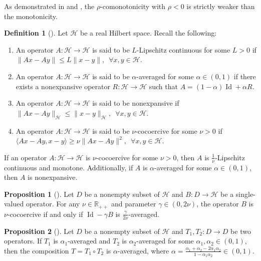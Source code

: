 \documentclass{article}
\theoremstyle{definition}
\newtheorem{proposition}{Proposition}[section]
\theoremstyle{definition}
\newtheorem{definition}{Definition}[section]
\theoremstyle{definition}
\begin{document}
As demonstrated in \cite[Example 1]{lee2021} and \cite[Example 3]{pethick2023}, the $\rho$-comonotonicity with $\rho < 0$ is strictly weaker than the monotonicity.

\begin{definition} [\cite{bauschke2017convex}]
Let $\mathcal{H}$ be a real Hilbert space.  Recall the following: 
\begin{enumerate}[label=(\roman*)]
    \item[(1)] An operator $A: \mathcal{H} \rightarrow \mathcal{H}$ is said to be $L$-Lipschitz continuous for some $L>0$ if
    $
    \| A x - A y \| \leq L \| x - y \|,\,\,\,  \forall x, y \in \mathcal{H}.
    $
    \item[\rm (2)] An operator $A: \mathcal{H} \rightarrow \mathcal{H}$ is said to be $\alpha$-averaged for some $\alpha \in \left( 0, 1 \right)$ if there exists a nonexpansive operator $R: \mathcal{H} \to \mathcal{H}$ such that
    $
    A = (1 - \alpha)\operatorname{Id} + \alpha R.
    $
    \item[(3)] An operator $A: \mathcal{H} \rightarrow \mathcal{H}$ is said to be nonexpansive if
    $
    \| A x - A y \|_{\mathcal{H}} \leq \| x - y \|_{\mathcal{H}},\,\,\,  \forall x, y \in \mathcal{H}.
    $
    \item[(4)] An operator $A: \mathcal{H} \rightarrow \mathcal{H}$ is said to be $\nu$-cocoercive for some $\nu>0$ if
    $
    \langle A x - A y, x - y \rangle \geq \nu \| A x - A y \|^2,\,\,\,  \forall x, y \in \mathcal{H}.
    $
\end{enumerate}
\end{definition}

If an operator $A: \mathcal{H} \rightarrow \mathcal{H}$ is $\nu$-cocoercive for some $\nu > 0$, then $A$ is $\frac{1}{\nu}$-Lipschitz continuous and monotone. Additionally, if $A$ is $\alpha$-averaged for some $\alpha \in \left( 0, 1 \right)$, then $A$ is nonexpansive.

\begin{proposition} [\cite{bauschke2017convex}] \label{prop:cocoercive_averaged}
Let $D$ be a nonempty subset of $\mathcal{H}$ and $B: D \to \mathcal{H}$ be a single-valued operator. For any $\nu \in \mathbb{R}_{++}$ and parameter $\gamma \in \left( 0, 2\nu \right)$, the operator $B$ is $\nu$-cocoercive if and only if $\operatorname{Id} - \gamma B$ is $\frac{\gamma}{2\nu}$-averaged.
\end{proposition}

\begin{proposition} [\cite{bauschke2017convex}] \label{prop:composition_averaged}
Let $D$ be a nonempty subset of $\mathcal{H}$ and $T_{1}, T_{2} : D \to D$ be two operators. If $T_{1}$ is $\alpha_{1}$-averaged and $T_{2}$ is $\alpha_{2}$-averaged for some $\alpha_{1}, \alpha_{2} \in \left( 0, 1 \right)$, then the composition $T = T_{1} \circ T_{2}$ is $\alpha$-averaged, where $\alpha = \frac{\alpha_{1} + \alpha_{2} - 2\alpha_{1} \alpha_{2}}{1 - \alpha_{1} \alpha_{2}}\in \left( 0, 1 \right)$.
\end{proposition}
\end{document}
